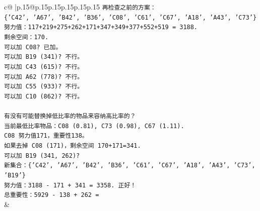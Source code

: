 \documentclass{article}
\begin{document}
{\begin{supertabular}{c@{$\;$}|p{.15\linewidth}@{}p{.15\linewidth}p{.15\linewidth}p{.15\linewidth}p{.15\linewidth}p{.15\linewidth}}
{{{\texttt{再检查之前的方案：} \\
\texttt{\{'C42', 'A67', 'B42', 'B36', 'C08', 'C61', 'C67', 'A18', 'A43', 'C73'\}} \\
\texttt{努力值：117+219+275+262+171+347+349+377+552+519 = 3188.} \\
\texttt{剩余空间：170.} \\
\texttt{可以加 C08? 已加。} \\
\texttt{可以加 B19 (341)? 不行。} \\
\texttt{可以加 C43 (615)? 不行。} \\
\texttt{可以加 A62 (778)? 不行。} \\
\texttt{可以加 C55 (933)? 不行。} \\
\texttt{可以加 C10 (862)? 不行。} \\
\\ 
\texttt{有没有可能替换掉低比率的物品来容纳高比率的？} \\
\texttt{当前最低比率物品：C08 (0.81), C73 (0.98), C67 (1.11).} \\
\texttt{C08 努力值171，重要性138。} \\
\texttt{如果去掉 C08 (171)，剩余空间 170+171=341.} \\
\texttt{可以加 B19 (341, 262)?} \\
\texttt{新集合：\{'C42', 'A67', 'B42', 'B36', 'C61', 'C67', 'A18', 'A43', 'C73', 'B19'\}} \\
\texttt{努力值：3188 {-} 171 + 341 = 3358. 正好！} \\
\texttt{总重要性：5929 {-} 138 + 262 =} \\
            }
        }
    }
    & \\ \\


\end{supertabular}}
\end{document}
